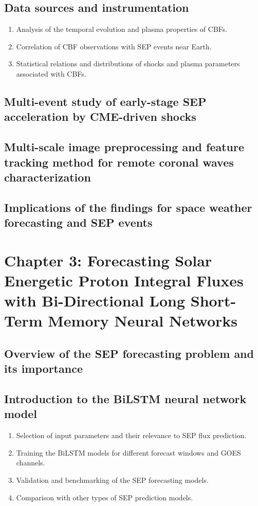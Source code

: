 \documentclass{article}
\begin{document}
\subsection{Data sources and instrumentation}
\begin{enumerate}
    \item Analysis of the temporal evolution and plasma properties of CBFs.
    \item Correlation of CBF observations with SEP events near Earth.
    \item Statistical relations and distributions of shocks and plasma parameters associated with CBFs.
\end{enumerate}
\subsection{Multi-event study of early-stage SEP acceleration by CME-driven shocks}
\subsection{Multi-scale image preprocessing and feature tracking method for remote coronal waves characterization}
\subsection{Implications of the findings for space weather forecasting and SEP events}

\section{Chapter 3: Forecasting Solar Energetic Proton Integral Fluxes with Bi-Directional Long Short-Term Memory Neural Networks}
\subsection{Overview of the SEP forecasting problem and its importance}
\subsection{Introduction to the BiLSTM neural network model}
\begin{enumerate}
    \item Selection of input parameters and their relevance to SEP flux prediction.
    \item Training the BiLSTM models for different forecast windows and GOES channels.
    \item Validation and benchmarking of the SEP forecasting models.
    \item Comparison with other types of SEP prediction models.
\end{enumerate}
\end{document}
